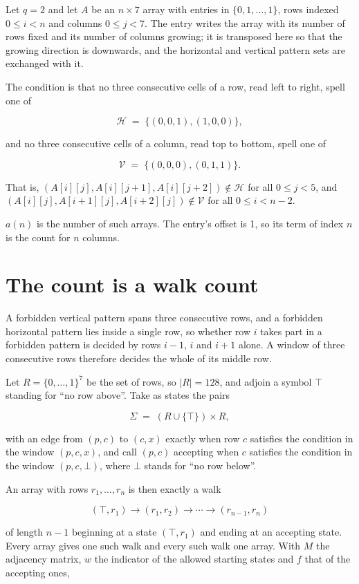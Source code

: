 \documentclass[11pt]{article}
\theoremstyle{definition}
\begin{document}
Let $q = 2$ and let $A$ be an $n \times 7$ array with entries in $\{0,1,\dots,1\}$, rows indexed $0 \le i < n$ and columns $0 \le j < 7$. The entry writes the array with its number of rows fixed and its number of columns growing; it is transposed here so that the growing direction is downwards, and the horizontal and vertical pattern sets are exchanged with it.

The condition is that no three consecutive cells of a row, read left to right, spell one of

\[\mathcal{H} \;=\; \{(0,0,1), (1,0,0)\},\]

and no three consecutive cells of a column, read top to bottom, spell one of

\[\mathcal{V} \;=\; \{(0,0,0), (0,1,1)\}.\]

That is, $(A[i][j],A[i][j{+}1],A[i][j{+}2]) \notin \mathcal{H}$ for all $0 \le j < 5$, and $(A[i][j],A[i{+}1][j],A[i{+}2][j]) \notin \mathcal{V}$ for all $0 \le i < n-2$.

$a(n)$ is the number of such arrays. The entry's offset is 1, so its term of index $n$ is the count for $n$ columns.

\section{The count is a walk count}

A forbidden vertical pattern spans three consecutive rows, and a forbidden horizontal pattern lies inside a single row, so whether row $i$ takes part in a forbidden pattern is decided by rows $i-1$, $i$ and $i+1$ alone. A window of three consecutive rows therefore decides the whole of its middle row.

Let $R = \{0,\dots,1\}^{7}$ be the set of rows, so $|R| = 128$, and adjoin a symbol $\top$ standing for ``no row above''. Take as states the pairs

\[\Sigma \;=\; (R \cup \{\top\}) \times R,\]

with an edge from $(p,c)$ to $(c,x)$ exactly when row $c$ satisfies the condition in the window $(p,c,x)$, and call $(p,c)$ accepting when $c$ satisfies the condition in the window $(p,c,\bot)$, where $\bot$ stands for ``no row below''.

An array with rows $r_1,\dots,r_n$ is then exactly a walk

\[(\top,r_1) \to (r_1,r_2) \to \cdots \to (r_{n-1},r_n)\]

of length $n-1$ beginning at a state $(\top,r_1)$ and ending at an accepting state. Every array gives one such walk and every such walk one array. With $M$ the adjacency matrix, $w$ the indicator of the allowed starting states and $f$ that of the accepting ones,
\end{document}
